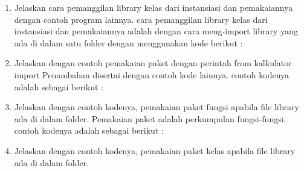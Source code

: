 \begin{enumerate}
    \item Jelaskan cara pemanggilan library kelas dari instansiasi dan pemakaiannya dengan contoh program lainnya.
cara pemanggilan  library kelas dari instansiasi dan pemakaiannya adalah dengan cara meng-import library yang ada di dalam satu folder dengan menggunakan kode berikut :
 

    \item Jelaskan dengan contoh pemakaian paket dengan perintah from kalkulator import Penambahan disertai dengan contoh kode lainnya.
contoh kodenya adalah sebagai berikut :
 

    \item Jelaskan dengan contoh kodenya, pemakaian paket fungsi apabila file library ada di dalam folder.
 Pemakaian paket adalah perkumpulan fungsi-fungsi. contoh kodenya adalah sebagai berikut :
 

    \item Jelaskan dengan contoh kodenya, pemakaian paket kelas apabila file library ada di dalam folder.
 

\end{enumerate}


